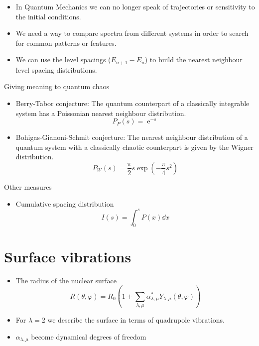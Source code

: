 \documentclass[a4,compress]{beamer}
\newcommand{\ee}{\operatorname{e}}          %
\begin{document}
\begin{frame}
  \begin{itemize}
    \item In Quantum Mechanics we can no longer speak of trajectories
    or sensitivity to the initial conditions.
    \item We need a way to compare spectra from different systems
    in order to search for common patterns or features.
    \item We can use the level spacings (\(E_{n+1} - E_n\)) to build
    the nearest neighbour level spacing distributions.
  \end{itemize}
\end{frame}


\begin{frame}{Giving meaning to quantum chaos}
  \begin{itemize}
    \item Berry-Tabor conjecture: The quantum counterpart of a classically integrable
    system has a Poissonian nearest neighbour distribution.
    \[
      P_P(s) = \ee^{-s}
    \]
    \item Bohigas-Gianoni-Schmit conjecture: The nearest neighbour distribution
    of a quantum system with a classically chaotic counterpart is given by
    the Wigner distribution.
    \[
      P_W(s) = \frac{\pi}{2} s \exp(-\frac{\pi}{4} s^2)
    \]
  \end{itemize}
\end{frame}


\begin{frame}{Other measures}
  \begin{itemize}
    \item Cumulative spacing distribution
    \[
      I(s) = \int_0^s P(x) \dd{x}
    \]
  \end{itemize}
\end{frame}

\section[Model]{Surface vibrations}


\begin{frame}
  \begin{itemize}
    \item The radius of the nuclear surface
    \[
      R(\theta, \varphi) = R_0 \left( 1 + \sum_{\lambda, \mu}
          \alpha_{\lambda,\mu}^* Y_{\lambda,\mu}(\theta, \varphi) \right)
    \]
    \item For \(\lambda = 2\) we describe the surface in terms of
    quadrupole vibrations.
    \item \(\alpha_{\lambda,\mu}\) become dynamical degrees of freedom
  \end{itemize}
\end{frame}
\end{document}
